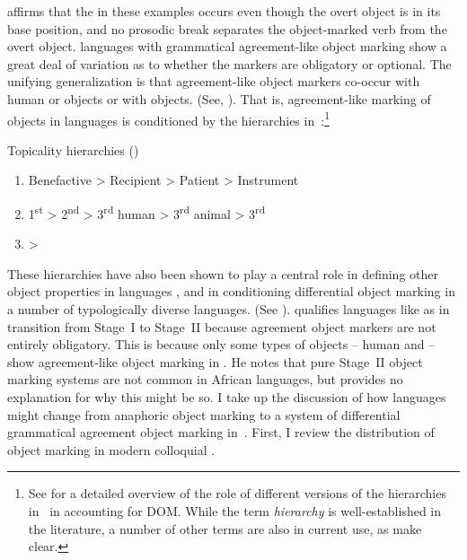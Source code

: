 \documentclass[output=paper]{LSP/langsci}
\begin{document}
\citet{Riedel2009Syntax} affirms that the  in these examples occurs even though the overt object is in its base position, and no prosodic break separates the object-marked verb from the overt object.
 languages with grammatical agreement-like object marking show a great deal of variation as to whether the markers are obligatory or optional. 
The unifying generalization is that agreement-like object markers co-occur with human or  objects or with  objects. 
(See, \eg \citealt{Duranti1979Object,Bentley1994Syntactic,Morimoto2002Prominence, Riedel2009Syntax,Martenetal2012Object,vanderWal2015Bantu}). 
That is, agreement-like marking of objects in  languages is conditioned by the  hierarchies in~:\footnote{See  for a detailed overview of the role of different versions of the hierarchies in~ in accounting for DOM. 
While the term \emph{ hierarchy} is well-established in the literature, a number of other terms are also in current use, as  make clear.}

\ea \label{02-do-ex:8}
Topicality hierarchies (\citealt[224]{Hymanetal1982Bantu})
\renewcommand{\theenumi}{\alph{enumi}}
\begin{enumerate}
\item Benefactive > Recipient > Patient > Instrument
\item 1\textsuperscript{st} > 2\textsuperscript{nd} > 3\textsuperscript{rd} human > 3\textsuperscript{rd} animal > 3\textsuperscript{rd} 
\item {} > 
\end{enumerate}
\z

\noindent These hierarchies have also been shown to play a central role in defining other object properties in  languages \citep{Duranti1979Object, Hymanetal1974Hierarchies, Hymanetal1982Bantu}, and in conditioning differential object marking in a number of typologically diverse languages. 
(See \eg \citealt{Comrie1981Language, Comrie1989Language,Aissen2003Differential,Iemmolo2013Symmetric,Iemmolo2014Differential}). 
\citet[48--49]{Creissels2006Typology} qualifies  languages like  as in transition from Stage~I to Stage~II because agreement object markers are not entirely obligatory. 
This is because only some types of objects – human and  – show agreement-like object marking in . 
He notes that pure Stage~II object marking systems are not common in African languages, but provides no explanation for why this might be so. 
I take up the discussion of how languages might change from anaphoric object marking to a system of differential grammatical agreement object marking in~. 
First, I review the distribution of object marking in modern colloquial .
\end{document}
